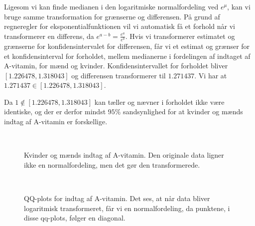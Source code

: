 Ligesom vi kan finde medianen i den logaritmiske normalfordeling ved $e^{\mu}$,
kan vi bruge samme transformation for grænserne og differensen. På grund af
regneregler for eksponentialfunktionen vil vi automatisk få et forhold når vi
transformerer en differens, da $e^{a - b} = \frac{e^a}{e^b}$.  Hvis vi
transformerer estimatet og grænserne for konfidensintervalet for differensen,
får vi et estimat og grænser for et konfidensinterval for forholdet, mellem
medianerne i fordelingen af indtaget af A-vitamin, for mænd og kvinder.
Konfidensintervallet for forholdet bliver $[1.226478, 1.318043]$ og differensen
transformerer til $1.271437$. Vi har at $1.271437 \in [1.226478, 1.318043]$.

Da $1 \notin [1.226478, 1.318043]$ kan tæller og nævner i forholdet ikke være
identiske, og der er derfor mindst $95\%$ sandsynlighed for at kvinder og mænds
indtag af A-vitamin er forskellige.

\begin{figure}[!h]
    \centering
    \\
    \caption{Kvinder og mænds indtag af A-vitamin. Den originale data ligner
    ikke en normalfordeling, men det gør den transformerede.}
    \label{avitPlots}
\end{figure}

\begin{figure}[!h]
    \centering
    \\
    \caption{QQ-plots for indtag af A-vitamin. Det ses, at når data bliver
    logaritmisk transformeret, får vi en normalfordeling, da punktene, i disse
    qq-plots, følger en diagonal.}
    \label{avitPlots_qq}
\end{figure}

